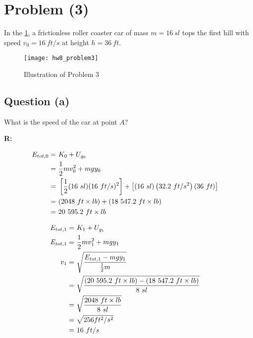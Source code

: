 \section{Problem (3)}

	In the \cref{fig:hw8_problem3}, a frictionless roller coaster car of mass $m = 16 \ sl$ tops the first hill with speed $v_{0} = 16 \ ft/s$ at height $h = 36 \ ft$.

	\begin{figure}[H]
		\begin{center}
			\texttt{[image: hw8\_problem3]}
			\caption{Illustration of Problem 3}
			\label{fig:hw8_problem3}
		\end{center}
	\end{figure}

	\subsection{Question (a)}

		What is the speed of the car at point $A$?

		\textbf{R:}

		\begin{align}
			E_{tot,0} = \ &K_{0} + U_{g_{0}}& \notag \\
			= \ &\frac{1}{2} mv_{0}^{2} + mgy_{0}& \notag \\
			= \ &\left[\frac{1}{2}(16 \ sl)(16 \ ft/s)^{2}\right] + \left[(16 \ sl)\left(32.2 \ ft/s^{2}\right)(36 \ ft)\right]& \notag \\
			= \ &(2048 \ ft \times lb) + (18 \ 547.2 \ ft \times lb)& \notag \\
			= \ &20 \ 595.2 \ ft \times lb& \notag
		\end{align}

		\begin{align}
			E_{tot,1} = \ &K_{1} + U_{g_{1}}& \notag \\
			E_{tot,1} = \ &\frac{1}{2} mv_{1}^{2} + mgy_{1}& \notag \\
			v_{1} = \ &\sqrt{\frac{E_{tot,1} - mgy_{1}}{\frac{1}{2}m}}& \notag \\
			= \ &\sqrt{\frac{(20 \ 595.2 \ ft \times lb) - (18 \ 547.2 \ ft \times lb)}{8 \ sl}}& \notag \\
			= \ &\sqrt{\frac{2048 \ ft \times lb}{8 \ sl}}& \notag \\
			= \ &\sqrt{256 ft^{2}/s^{2}}& \notag \\
			= \ &16 \ ft/s&
		\end{align}

